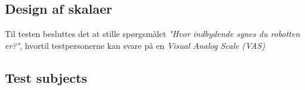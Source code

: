 \subsection*{Design af skalaer}
%
Til testen besluttes det at stille spørgsmålet \textit{"Hvor indbydende synes du robotten er?"}, hvortil testpersonerne kan svare på en \textit{Visual Analog Scale (VAS)}


\subsection*{Test subjects}
